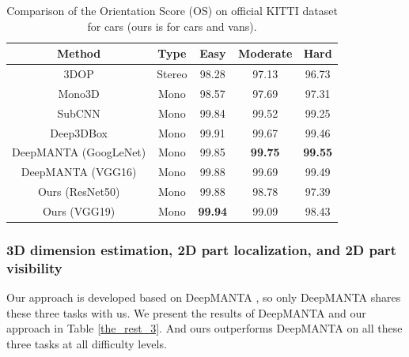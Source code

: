 \documentclass[a4paper,12pt]{article}
\begin{document}
\begin{table}[H]
	\centering
	\caption[Comparison of the 3D orientation estimation performance.]{Comparison of the Orientation Score (OS) on official KITTI dataset for cars (ours is for cars and vans).}
	\label{os_cmp}
\begin{tabular}{|c|c|c|c|c|}
	\hline
	Method                                                                        & Type   & Easy           & Moderate       & Hard           \\ \hline
	3DOP \cite{Chen:2015:OPA:2969239.2969287}                    & Stereo & 98.28          & 97.13          & 96.73          \\ \hline
	Mono3D \cite{cvpr16chen}                                     & Mono   & 98.57          & 97.69          & 97.31          \\ \hline
	SubCNN \cite{DBLP:journals/corr/XiangCLS16}                  & Mono   & 99.84          & 99.52          & 99.25          \\ \hline
	Deep3DBox \cite{DBLP:journals/corr/MousavianAFK16}           & Mono   & 99.91 & 99.67          & 99.46          \\ \hline
	DeepMANTA (GoogLeNet) \cite{DBLP:journals/corr/ChabotCRTC17} & Mono   & 99.85          & \textbf{99.75} & \textbf{99.55} \\ \hline
	DeepMANTA (VGG16) \cite{DBLP:journals/corr/ChabotCRTC17}     & Mono   & 99.88          & 99.69          & 99.49          \\ \hline
	Ours (ResNet50)                                                               & Mono   & 99.88          & 98.78          & 97.39          \\ \hline
	Ours (VGG19)																	& Mono	 & \textbf{99.94}	       & 99.09	      & 98.43         \\ \hline
	
\end{tabular}
\end{table}

\subsubsection{3D dimension estimation, 2D part localization, and 2D part visibility}
Our approach is developed based on DeepMANTA \cite{DBLP:journals/corr/ChabotCRTC17}, so only DeepMANTA shares these three tasks with us. We present the results of DeepMANTA and our approach in Table \ref{the_rest_3}. And ours outperforms DeepMANTA on all these three tasks at all difficulty levels.
\end{document}
